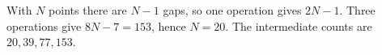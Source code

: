 With $N$ points there are $N-1$ gaps, so one operation gives $2N-1$. Three operations give $8N-7=153$, hence $\boxed{N=20}$. The intermediate counts are $20,39,77,153$.
